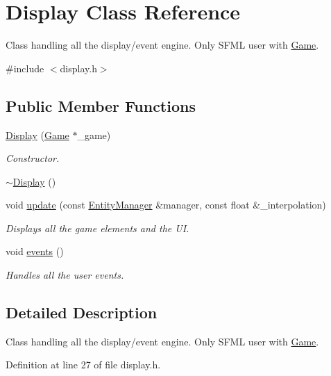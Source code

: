 \hypertarget{class_display}{\section{Display Class Reference}
\label{class_display}
}


Class handling all the display/event engine. Only S\-F\-M\-L user with \hyperlink{class_game}{Game}.  




{\ttfamily \#include $<$display.\-h$>$}

\subsection*{Public Member Functions}
\begin{DoxyCompactItemize}
\item 
\hyperlink{class_display_a21052a50c5e922272d697aaf5cfb14cc}{Display} (\hyperlink{class_game}{Game} $\ast$\-\_\-game)
\begin{DoxyCompactList}\small\item\em Constructor. \end{DoxyCompactList}\item 
\hyperlink{class_display_ac2607a6bb236c55547a4223d40d85d1f}{$\sim$\-Display} ()
\item 
void \hyperlink{class_display_a713ee81045f32895c2b063037c81c388}{update} (const \hyperlink{class_entity_manager}{Entity\-Manager} \&manager, const float \&\-\_\-interpolation)
\begin{DoxyCompactList}\small\item\em Displays all the game elements and the U\-I. \end{DoxyCompactList}\item 
void \hyperlink{class_display_a05ee6cd33afcc51a5856148677a71c82}{events} ()
\begin{DoxyCompactList}\small\item\em Handles all the user events. \end{DoxyCompactList}\end{DoxyCompactItemize}


\subsection{Detailed Description}
Class handling all the display/event engine. Only S\-F\-M\-L user with \hyperlink{class_game}{Game}. 

Definition at line 27 of file display.\-h.



